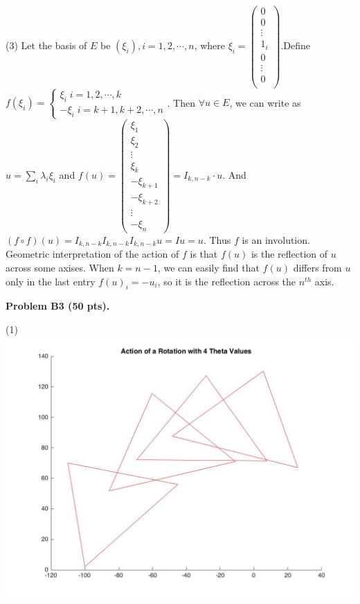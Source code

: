 \documentclass[12pt]{article}
\begin{document}
\medskip
(3)
Let the basis of $E$ be $(\xi_i), i = 1, 2, \cdots, n$, where $\xi_i = 
\begin{pmatrix}
0 \\
0 \\
\vdots \\
1_i \\
0 \\
\vdots \\
0 \\
\end{pmatrix}
$.Define \\
$
f(\xi_i) = \left \{
				\begin{array}{ll}
				\xi_i \; i = 1,2,\cdots,k \\
				-\xi_i \; i = k+1, k+2, \cdots, n				
				\end{array}
			\right.
$. Then $\forall u \in E$, we can write as $u = \sum_i \lambda_i \xi_i$ and $f(u) = 
\begin{pmatrix}
\xi_1 \\
\xi_2 \\
\vdots \\
\xi_k \\
-\xi_{k+1} \\
-\xi_{k+2} \\
\vdots \\
-\xi_n
\end{pmatrix} 
= I_{k , n - k} \cdot u
$. 
And $
(f \circ f)(u) = I_{k , n - k}I_{k , n - k}  I_{k , n - k}  u = I u = u
$. Thus $f$ is an involution.\\
Geometric interpretation of the action of $f$ is that $f(u)$ is the reflection of $u$ across some axises. When $k = n - 1$, we can easily find that $f(u)$ differs from $u$ only in the last entry $f(u)_i = -u_i$, so it is the reflection across the $n^{th}$ axis.

\vspace {0.5cm}\noindent
{\bf Problem B3 (50 pts).}


\medskip
(1)\\
\includegraphics[scale=.25]{RotationPlot}
\end{document}
